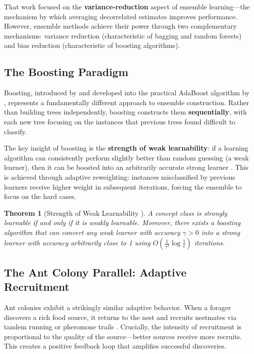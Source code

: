 \documentclass[12pt,letterpaper]{article}
\newtheorem{theorem}{Theorem}[section]
\begin{document}
That work focused on the \textbf{variance-reduction} aspect of ensemble learning—the mechanism by which averaging decorrelated estimates improves performance. However, ensemble methods achieve their power through two complementary mechanisms: variance reduction (characteristic of bagging and random forests) and bias reduction (characteristic of boosting algorithms).

\subsection{The Boosting Paradigm}

Boosting, introduced by \citet{schapire1990strength} and developed into the practical AdaBoost algorithm by \citet{freund1997decision}, represents a fundamentally different approach to ensemble construction. Rather than building trees independently, boosting constructs them \textbf{sequentially}, with each new tree focusing on the instances that previous trees found difficult to classify.

The key insight of boosting is the \textbf{strength of weak learnability}: if a learning algorithm can consistently perform slightly better than random guessing (a weak learner), then it can be boosted into an arbitrarily accurate strong learner \citep{schapire1990strength}. This is achieved through adaptive reweighting: instances misclassified by previous learners receive higher weight in subsequent iterations, forcing the ensemble to focus on the hard cases.

\begin{theorem}[Strength of Weak Learnability \citep{schapire1990strength}]
A concept class is strongly learnable if and only if it is weakly learnable. Moreover, there exists a boosting algorithm that can convert any weak learner with accuracy $\gamma > 0$ into a strong learner with accuracy arbitrarily close to 1 using $O(\frac{1}{\gamma^2}\log\frac{1}{\epsilon})$ iterations.
\end{theorem}

\subsection{The Ant Colony Parallel: Adaptive Recruitment}

Ant colonies exhibit a strikingly similar adaptive behavior. When a forager discovers a rich food source, it returns to the nest and recruits nestmates via tandem running or pheromone trails \citep{pratt2002recruitment}. Crucially, the intensity of recruitment is proportional to the quality of the source—better sources receive more recruits. This creates a positive feedback loop that amplifies successful discoveries.
\end{document}
